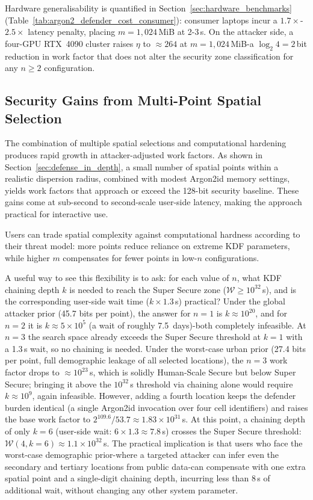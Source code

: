 \documentclass[journal,article,submit,pdftex,moreauthors]{Definitions/mdpi}
\newcommand{\add}[1]{#1}
\newcommand{\add}[1]{\added{#1}}
\begin{document}
\add{Hardware generalisability is quantified in Section~\ref{sec:hardware_benchmarks} (Table~\ref{tab:argon2_defender_cost_consumer}): consumer laptops incur a $1.7\times$-$2.5\times$ latency penalty, placing $m=1{,}024$\,MiB at 2-3\,s. On the attacker side, a four-GPU RTX~4090 cluster raises $\eta$ to $\approx 264$ at $m=1{,}024$\,MiB-a $\log_2 4 = 2$\,bit reduction in work factor that does not alter the security zone classification for any $n \geq 2$ configuration.}

\subsection{Security Gains from Multi-Point Spatial Selection}

The combination of multiple spatial selections and computational hardening produces rapid growth in attacker-adjusted work factors. As shown in Section~\ref{sec:defense_in_depth}, a small number of spatial points within a realistic dispersion radius, combined with modest Argon2id memory settings, yields work factors that approach or exceed the 128-bit security baseline. These gains come at sub-second to second-scale user-side latency, making the approach practical for interactive use.

Users can trade spatial complexity against computational hardness according to their threat model: more points reduce reliance on extreme KDF parameters, while higher $m$ compensates for fewer points in low-$n$ configurations.

\add{A useful way to see this flexibility is to ask: for each value of $n$, what KDF chaining depth $k$ is needed to reach the Super Secure zone ($\mathcal{W} \geq 10^{32}$\,s), and is the corresponding user-side wait time ($k \times 1.3$\,s) practical? Under the global attacker prior (45.7 bits per point), the answer for $n=1$ is $k \approx 10^{20}$, and for $n=2$ it is $k \approx 5 \times 10^5$ (a wait of roughly 7.5~days)-both completely infeasible. At $n=3$ the search space already exceeds the Super Secure threshold at $k=1$ with a 1.3\,s wait, so no chaining is needed. Under the worst-case urban prior (27.4 bits per point, full demographic leakage of all selected locations), the $n=3$ work factor drops to $\approx\!10^{23}$\,s, which is solidly Human-Scale Secure but below Super Secure; bringing it above the $10^{32}$\,s threshold via chaining alone would require $k \approx 10^9$, again infeasible. However, adding a fourth location keeps the defender burden identical (a single Argon2id invocation over four cell identifiers) and raises the base work factor to $2^{109.6}/53.7 \approx 1.83 \times 10^{31}$\,s. At this point, a chaining depth of only $k=6$ (user-side wait: $6 \times 1.3 \approx 7.8$\,s) crosses the Super Secure threshold: $\mathcal{W}(4, k=6) \approx 1.1 \times 10^{32}$\,s. The practical implication is that users who face the worst-case demographic prior-where a targeted attacker can infer even the secondary and tertiary locations from public data-can compensate with one extra spatial point and a single-digit chaining depth, incurring less than 8\,s of additional wait, without changing any other system parameter.}
\end{document}
